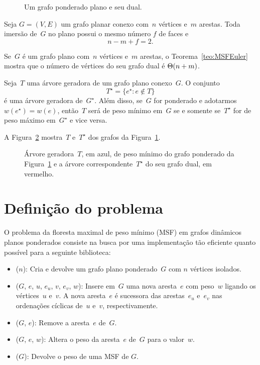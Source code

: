 \begin{figure}[htb]
\scalebox{1.5}{
\centering

}
\caption{Um grafo ponderado plano e seu dual.}
\label{fig:MSF-basico-1}
\end{figure}

\begin{theorem}
\label{teo:MSFEuler}
Seja $G=(V,E)$ um grafo planar conexo com~$n$ vértices e~$m$ arestas. Toda imersão de~$G$ no plano possui o mesmo número $f$ de faces e
$$
n-m+f = 2.
$$
\end{theorem}

Se~$G$ é um grafo plano com~$n$ vértices e~$m$ arestas, o Teorema~\ref{teo:MSFEuler} mostra que o número de vértices do seu grafo dual é $\Theta(n+m)$.

\begin{theorem}
\label{teo:MSFdual}
Seja~$T$ uma árvore geradora de um grafo plano conexo~$G$. O conjunto
$$
T^\star = \{e^\star:e\notin T\}
$$
é uma árvore geradora de~$G^\star$.
Além disso, se~$G$ for ponderado e adotarmos $w(e^\star) = w(e)$, então~$T$ será de peso mínimo em~$G$ se e somente se~$T^\star$ for de peso máximo em~$G^\star$ e vice versa.
\end{theorem}

A Figura~\ref{fig:MSF-figura-2} mostra~$T$ e~$T^\star$ dos grafos da Figura~\ref{fig:MSF-basico-1}.

\begin{figure}[htb]
\scalebox{1.5}{
\centering

}
\caption{Árvore geradora~$T$, em azul, de peso mínimo do grafo ponderado da Figura~\ref{fig:MSF-basico-1} e a árvore correspondente~$T^\star$ do seu grafo dual, em vermelho.}
\label{fig:MSF-figura-2}
\end{figure}





\section{Definição do problema}
\label{sec:definition-MSF}
O problema da floresta maximal de peso mínimo (MSF) em grafos dinâmicos planos ponderados consiste na busca por uma implementação tão eficiente quanto possível para a seguinte biblioteca:

\begin{itemize}
\item \MSFCreate($n$): Cria e devolve um grafo plano ponderado~$G$ com $n$ vértices isolados.
\item \MSFaddEdge($G$, $e$, $u$, $e_u$, $v$, $e_v$, $w$): Insere em~$G$ uma nova aresta~$e$ com peso~$w$ ligando os vértices~$u$ e~$v$. A nova aresta~$e$ é sucessora das arestas~$e_u$ e~$e_v$ nas ordenações cíclicas de~$u$ e~$v$, respectivamente.
\item \MSFdelEdge($G$, $e$): Remove a aresta~$e$ de~$G$.
\item \MSFupdate($G$, $e$, $w$): Altera o peso da aresta~$e$ de~$G$ para o valor~$w$.
\item \MSFweight($G$): Devolve o peso de uma MSF de $G$.
\end{itemize}

